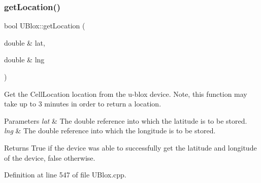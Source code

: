 \subsubsection{\texorpdfstring{get\+Location()}{getLocation()}}
{\footnotesize\ttfamily bool U\+Blox\+::get\+Location (\begin{DoxyParamCaption}\item[{double \&}]{lat,  }\item[{double \&}]{lng }\end{DoxyParamCaption})}

Get the Cell\+Location location from the u-\/blox device. Note, this function may take up to 3 minutes in order to return a location.


\begin{DoxyParams}{Parameters}
{\em lat} & The double reference into which the latitude is to be stored. \\
\hline
{\em lng} & The double reference into which the longitude is to be stored. \\
\hline
\end{DoxyParams}
\begin{DoxyReturn}{Returns}
True if the device was able to successfully get the latitude and longitude of the device, false otherwise. 
\end{DoxyReturn}


Definition at line 547 of file U\+Blox.\+cpp.



